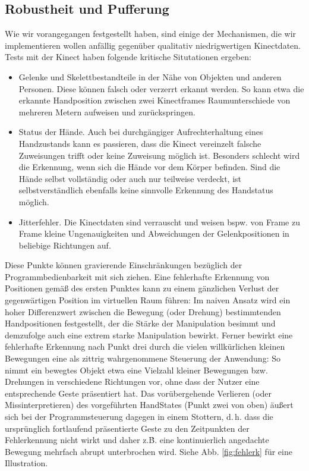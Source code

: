 	\subsection{Robustheit und Pufferung}\label{sec:robustheit}
	Wie wir vorangegangen festgestellt haben, sind einige der Mechanismen, die wir implementieren wollen anfällig gegenüber qualitativ niedrigwertigen Kinectdaten. Tests mit der Kinect haben folgende kritische Situtationen ergeben:
	\begin{itemize}
		\item Gelenke und Skelettbestandteile in der Nähe von Objekten und anderen Personen. Diese können falsch oder verzerrt erkannt werden. So kann etwa die erkannte Handposition zwischen zwei Kinectframes Raumunterschiede von mehreren Metern aufweisen und zurückspringen.
		\item Status der Hände. Auch bei durchgängiger Aufrechterhaltung eines Handzustands kann es passieren, dass die Kinect vereinzelt falsche Zuweisungen trifft oder keine Zuweisung möglich ist. Besonders schlecht wird die Erkennung, wenn sich die Hände vor dem Körper befinden. Sind die Hände selbst vollständig oder auch nur teilweise verdeckt, ist selbstverständlich ebenfalls keine sinnvolle Erkennung des Handstatus möglich.
		\item Jitterfehler. Die Kinectdaten sind verrauscht und weisen bspw. von Frame zu Frame kleine Ungenauigkeiten und Abweichungen der Gelenkpositionen in beliebige Richtungen auf.
	\end{itemize}
	Diese Punkte können gravierende Einschränkungen bezüglich der Programmbedienbarkeit mit sich ziehen. Eine fehlerhafte Erkennung von Positionen gemäß des ersten Punktes kann zu einem gänzlichen Verlust der gegenwärtigen Position im virtuellen Raum führen: Im naiven Ansatz wird ein hoher Differenzwert zwischen die Bewegung (oder Drehung) bestimmtenden Handpositionen festgestellt, der die Stärke der Manipulation besimmt und demzufolge auch eine extrem starke Manipulation bewirkt. Ferner bewirkt eine fehlerhafte Erkennung nach Punkt drei durch die vielen willkürlichen kleinen Bewegungen eine als \glqq zittrig\grqq{} wahrgenommene Steuerung der Anwendung: So nimmt ein bewegtes Objekt etwa eine Vielzahl kleiner Bewegungen bzw. Drehungen in verschiedene Richtungen vor, ohne dass der Nutzer eine entsprechende Geste präsentiert hat. Das vorübergehende Verlieren (oder Missinterpretieren) des vorgeführten HandStates (Punkt zwei von oben) äußert sich bei der Programmsteuerung dagegen in einem Stottern, d.\,h. dass die ursprünglich fortlaufend präsentierte Geste zu den Zeitpunkten der Fehlerkennung nicht wirkt und daher z.\.B. eine kontinuierlich angedachte Bewegung mehrfach abrupt unterbrochen wird. Siehe Abb. \ref{fig:fehlerk} für eine Illustration.
